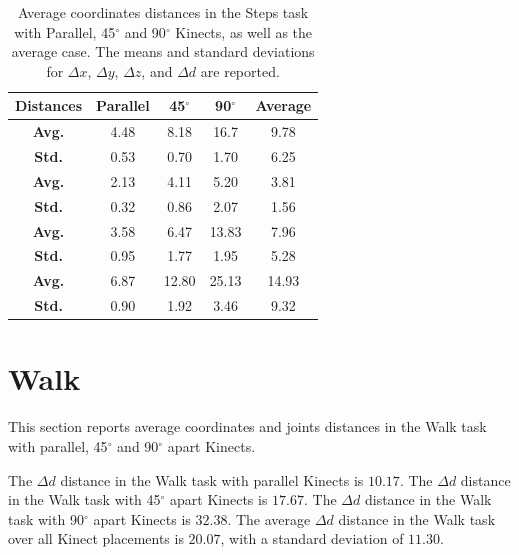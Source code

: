 \begin{table}[!h]
\centering
  
  \begin{tabulary}{1.0\linewidth}{||c c c c c||} 
   \hline
   \textbf{Distances} & \textbf{Parallel} & \textbf{45$^{\circ}$} & \textbf{90$^{\circ}$} & \textbf{Average} \\ [0.5ex] 
   \hline\hline
   \textbf{Avg.}  & 4.48 & 8.18 & 16.7 & 9.78 \\
   \hline
   \textbf{Std.}  & 0.53 & 0.70 & 1.70 & 6.25 \\
   \hline
   \textbf{Avg.}  & 2.13 & 4.11 & 5.20 & 3.81 \\
   \hline
   \textbf{Std.}  & 0.32 & 0.86 & 2.07 & 1.56 \\
   \hline
   \textbf{Avg.}  & 3.58 & 6.47 & 13.83 & 7.96 \\
   \hline
   \textbf{Std.}  & 0.95 & 1.77 & 1.95 & 5.28 \\
   \hline
   \textbf{Avg.}  & 6.87 & 12.80 & 25.13 & 14.93 \\
   \hline
   \textbf{Std.}  & 0.90 & 1.92 & 3.46 & 9.32 \\
   \hline
  \end{tabulary}

  \caption{Average coordinates distances in the Steps task with Parallel, 45$^{\circ}$ and 90$^{\circ}$ Kinects, as well as the average case. The means and standard deviations for $\Delta x$, $\Delta y$, $\Delta z$, and $\Delta d$ are reported.}
  
  \label{table:steps_coordinates_values}
\end{table}

% 
% 
\section{Walk}
\label{sec:results_walk}

This section reports average coordinates and joints distances in the Walk task with parallel, 45$^{\circ}$ and 90$^{\circ}$ apart Kinects.

The $\Delta d$ distance in the Walk task with parallel Kinects is $10.17$. The $\Delta d$ distance in the Walk task with 45$^{\circ}$ apart Kinects is $17.67$. The $\Delta d$ distance in the Walk task with 90$^{\circ}$ apart Kinects is $32.38$. The average $\Delta d$ distance in the Walk task over all Kinect placements is $20.07$, with a standard deviation of $11.30$.

